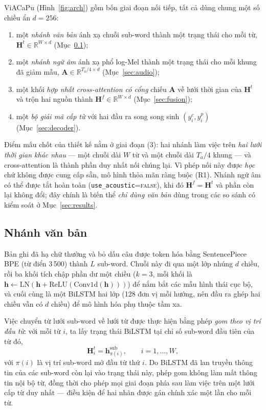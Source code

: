 \documentclass[conference,onecolumn]{IEEEtran}
\begin{document}
ViACaPu (Hình~\ref{fig:arch}) gồm bốn giai đoạn nối tiếp, tất cả dùng chung một số
chiều ẩn $d=256$:
\begin{enumerate}
\item[(1)] một \emph{nhánh văn bản} ánh xạ chuỗi sub-word thành một trạng thái cho
mỗi từ, $\mathbf{H}^{t}\in\mathbb{R}^{W\times d}$ (Mục~\ref{sec:text});
\item[(2)] một \emph{nhánh ngữ âm} ánh xạ phổ log-Mel thành một trạng thái cho mỗi
khung đã giảm mẫu, $\mathbf{A}\in\mathbb{R}^{T_a/4\times d}$ (Mục~\ref{sec:audio});
\item[(3)] một khối \emph{hợp nhất cross-attention có cổng} chiếu $\mathbf{A}$ về
lưới thời gian của $\mathbf{H}^{t}$ và trộn hai nguồn thành $\mathbf{H}^{f}
\in\mathbb{R}^{W\times d}$ (Mục~\ref{sec:fusion});
\item[(4)] một \emph{bộ giải mã cấp từ} với hai đầu ra song song sinh $(y^{c}_i,
y^{p}_i)$ (Mục~\ref{sec:decoder}).
\end{enumerate}
Điểm mấu chốt của thiết kế nằm ở giai đoạn (3): hai nhánh làm việc trên \emph{hai
lưới thời gian khác nhau} --- một chuỗi dài $W$ từ và một chuỗi dài $T_a/4$ khung
--- và cross-attention là thành phần duy nhất nối chúng lại. Vì phép nối này được
\emph{học} chứ không được cung cấp sẵn, mô hình thỏa mãn ràng buộc (R1). Nhánh ngữ
âm có thể được tắt hoàn toàn (\texttt{use\_acoustic}=\textsc{false}), khi đó
$\mathbf{H}^{f}\!=\!\mathbf{H}^{t}$ và phần còn lại không đổi; đây chính là biến
thể \emph{chỉ dùng văn bản} dùng trong các so sánh có kiểm soát ở
Mục~\ref{sec:results}.

\subsection{Nhánh văn bản}
\label{sec:text}
Bản ghi đã hạ chữ thường và bỏ dấu câu được token hóa bằng SentencePiece BPE (từ
điển 3\,500) thành $L$ sub-word. Chuỗi này đi qua một lớp nhúng $d$ chiều, rồi ba
khối tích chập phần dư một chiều ($k=3$, mỗi khối là $\mathbf{h}\!\leftarrow\!
\mathrm{LN}(\mathbf{h}+\mathrm{ReLU}(\mathrm{Conv1d}(\mathbf{h})))$) để nắm bắt các
mẫu hình thái cục bộ, và cuối cùng là một BiLSTM hai lớp (128 đơn vị mỗi hướng, nên
đầu ra ghép hai chiều vẫn có $d$ chiều) để mô hình hóa phụ thuộc tầm xa.

Việc chuyển từ lưới sub-word về lưới từ được thực hiện bằng phép \emph{gom theo vị
trí đầu từ}: với mỗi từ $i$, ta lấy trạng thái BiLSTM tại chỉ số sub-word đầu tiên
của từ đó,
\begin{equation}
\mathbf{H}^{t}_{i} = \mathbf{h}^{\mathrm{sub}}_{\pi(i)},\qquad i=1,\dots,W,
\end{equation}
với $\pi(i)$ là vị trí sub-word mở đầu từ thứ $i$. Do BiLSTM đã lan truyền thông
tin của các sub-word còn lại vào trạng thái này, phép gom không làm mất thông tin
nội bộ từ, đồng thời cho phép mọi giai đoạn phía sau làm việc trên một lưới cấp từ
duy nhất --- điều kiện để hai nhãn được gán chính xác một lần cho mỗi từ.
\end{document}
